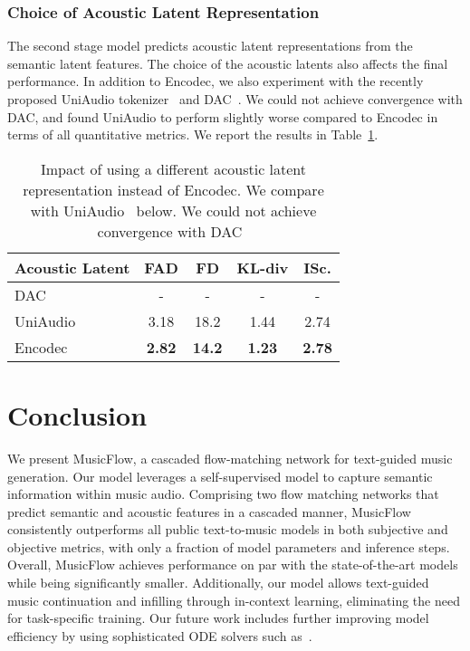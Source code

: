 \subsubsection{Choice of Acoustic Latent Representation} 
The second stage model predicts acoustic latent representations from the semantic latent features. The choice of the acoustic latents also affects the final performance. In addition to Encodec, we also experiment with the recently proposed UniAudio tokenizer~\cite{uniaudio} and DAC~\cite{dac}. We could not achieve convergence with DAC, and found UniAudio to perform slightly worse compared to Encodec in terms of all quantitative metrics. We report the results in Table~\ref{tab:acoustic_latents}.

\begin{table}[htp]
\caption{Impact of using a different acoustic latent representation instead of Encodec. We compare with UniAudio~\cite{uniaudio} below. We could not achieve convergence with DAC~\cite{dac}}
\label{tab:acoustic_latents}
\begin{center}
\begin{small}
\begin{sc}
\begin{tabular}{lcccc}
\toprule
Acoustic Latent & FAD & FD & KL-div & ISc. \\
\midrule
DAC & - & - & - & - \\
UniAudio & 3.18 & 18.2 & 1.44  & 2.74 \\
Encodec & \textbf{2.82} & \textbf{14.2} & \textbf{1.23}& \textbf{2.78} \\
\bottomrule
\end{tabular}
\end{sc}
\end{small}
\end{center}
\end{table}

\section{Conclusion}
We present MusicFlow, a cascaded flow-matching network for text-guided music generation. Our model leverages a self-supervised model to capture semantic information within music audio. 
Comprising two flow matching networks that predict semantic and acoustic features in a cascaded manner, MusicFlow consistently outperforms all public text-to-music models in both subjective and objective metrics, with only a fraction of model parameters and inference steps.
Overall, MusicFlow achieves performance on par with the state-of-the-art models while being significantly smaller. 
Additionally, our model allows text-guided music continuation and infilling through in-context learning, eliminating the need for task-specific training. Our future work includes further improving model efficiency by using sophisticated ODE solvers such as~\cite{shaul2023bespoke}. 

